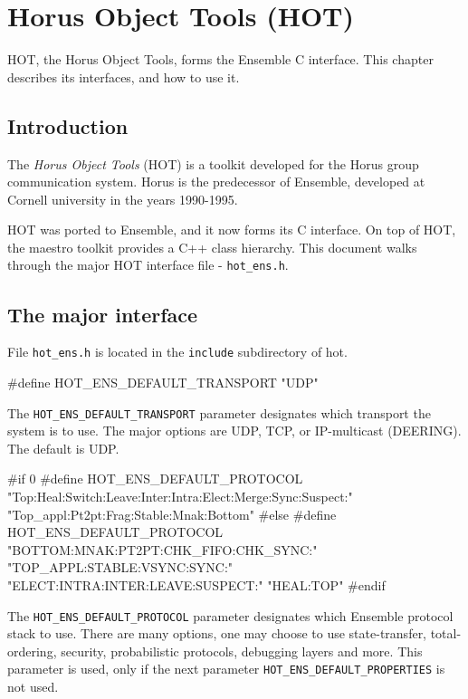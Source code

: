 %
%
%
\section{Horus Object Tools (HOT)}

HOT, the Horus Object Tools, forms the Ensemble C interface. This
chapter describes its interfaces, and how to use it. 

\subsection{Introduction}
The {\it Horus Object Tools} (HOT) is a toolkit developed for
the Horus group communication system. Horus is the predecessor of
Ensemble, developed at Cornell university in the years 1990-1995. 

HOT was ported to Ensemble, and it now forms its C interface. On top
of HOT, the maestro toolkit provides a C++ class hierarchy. This
document walks through the major HOT interface file - {\tt hot\_ens.h}.

\subsection{The major interface }
File {\tt hot\_ens.h} is located in the {\tt include} subdirectory 
of hot. 

\begin{codebox}
#define HOT_ENS_DEFAULT_TRANSPORT "UDP"
\end{codebox}
The {\tt HOT\_ENS\_DEFAULT\_TRANSPORT} parameter designates which
transport the system is to use. The major options are UDP, TCP,
or IP-multicast (DEERING). The default is UDP. 

\begin{codebox}
#if 0
#define HOT_ENS_DEFAULT_PROTOCOL 
      "Top:Heal:Switch:Leave:Inter:Intra:Elect:Merge:Sync:Suspect:" 
      "Top_appl:Pt2pt:Frag:Stable:Mnak:Bottom"
#else
#define HOT_ENS_DEFAULT_PROTOCOL 
   "BOTTOM:MNAK:PT2PT:CHK_FIFO:CHK_SYNC:" 
   "TOP_APPL:STABLE:VSYNC:SYNC:" 
   "ELECT:INTRA:INTER:LEAVE:SUSPECT:" 
   "HEAL:TOP"
#endif
\end{codebox}
The {\tt HOT\_ENS\_DEFAULT\_PROTOCOL} parameter designates which
Ensemble protocol stack to use. There are many options, one may choose
to use state-transfer, total-ordering, security, probabilistic
protocols, debugging layers and more. This parameter is used, only if
the next parameter {\tt HOT\_ENS\_DEFAULT\_PROPERTIES} is not used.

